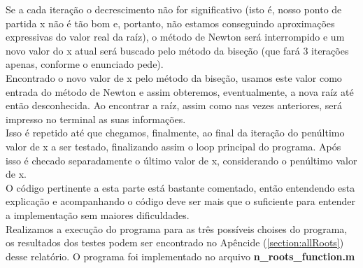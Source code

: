   Se a cada iteração o decrescimento não for significativo (isto é, nosso ponto de partida x não é tão bom e, portanto, não estamos conseguindo aproximações expressivas do valor real da raíz), o método de Newton será interrompido e um novo valor do x atual será buscado pelo método da biseção (que fará 3 iterações apenas, conforme o enunciado pede).\\

  Encontrado o novo valor de x pelo método da biseção, usamos este valor como entrada do método de Newton e assim obteremos, eventualmente, a nova raíz até então desconhecida. Ao encontrar a raíz, assim como nas vezes anteriores, será impresso no terminal as suas informações.\\

  Isso é repetido até que chegamos, finalmente, ao final da iteração do penúltimo valor de x a ser testado, finalizando assim o loop principal do programa. Após isso é checado separadamente o último valor de x, considerando o penúltimo valor de x.\\

  O código pertinente a esta parte está bastante comentado, então entendendo esta explicação e acompanhando o código deve ser mais que o suficiente para entender a implementação sem maiores dificuldades.\\

  Realizamos a execução do programa para as três possíveis choises do programa, os resultados dos testes podem ser encontrado no Apêncide (\ref{section:allRoots}) desse relatório. O programa foi implementado no arquivo \textbf{n\_roots\_function.m}


